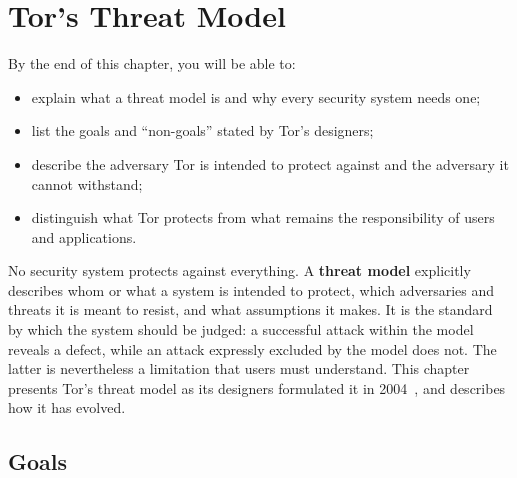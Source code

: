 \chapter{Tor's Threat Model}\label{cap:04-modello-minaccia}

\begin{obiettivi}
By the end of this chapter, you will be able to:
\begin{itemize}[nosep]
  \item explain what a threat model is and why every security system needs one;
  \item list the goals and \enquote{non-goals} stated by Tor's designers;
  \item describe the adversary Tor is intended to protect against and the adversary it cannot withstand;
  \item distinguish what Tor protects from what remains the responsibility of users and applications.
\end{itemize}
\end{obiettivi}

No security system protects against everything. A \textbf{threat model} explicitly describes whom or what a system is intended to protect, which adversaries and threats it is meant to resist, and what assumptions it makes. It is the standard by which the system should be judged: a successful attack within the model reveals a defect, while an attack expressly excluded by the model does not. The latter is nevertheless a limitation that users must understand. This chapter presents Tor's threat model as its designers formulated it in 2004~\cite{dingledine2004tor}, and describes how it has evolved.

\section{Goals}\label{sec:minaccia-obiettivi}

